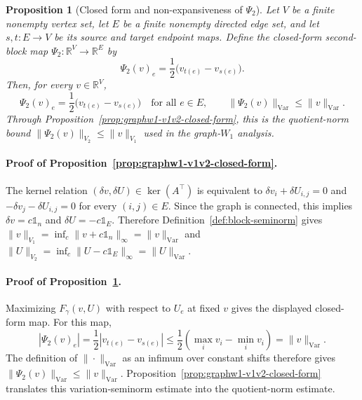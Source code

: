 \documentclass{article}
\theoremstyle{plain}
\newtheorem{proposition}{Proposition}[section]
\newcommand{\ones}{\mathds{1}}
\newcommand{\Edge}{E}
\newcommand{\RR}{\mathbb{R}}
\newcommand{\norm}[1]{\|#1\|}
\newcommand{\normVar}[1]{\norm{#1}_{\mathrm{Var}}}
\begin{document}
\begin{proposition}[Closed form and non-expansiveness of $\Psi_2$]\label{prop:graphw1-psi2-closed-nonexp}
Let $V$ be a finite nonempty vertex set, let $E$ be a finite nonempty directed edge set,
and let $s,t:E\to V$ be its source and target endpoint maps.  Define the closed-form second-block map
$\Psi_2:\RR^V\to\RR^E$ by
\[
  \Psi_2(v)_e=\frac12\bigl(v_{t(e)}-v_{s(e)}\bigr).
\]
Then, for every $v\in\RR^V$,
\begin{equation}\label{eq:Psi2_closed_symmetric}
  \Psi_2(v)_e=\frac12\bigl(v_{t(e)}-v_{s(e)}\bigr)
  \quad\text{for all }e\in E,
  \qquad
  \normVar{\Psi_2(v)}\le \normVar{v}.
\end{equation}
Through Proposition~\ref{prop:graphw1-v1v2-closed-form}, this is the quotient-norm
bound $\|\Psi_2(v)\|_{V_2}\le \|v\|_{V_1}$ used in the graph-$W_1$ analysis.
\end{proposition}

\paragraph{Proof of Proposition~\ref{prop:graphw1-v1v2-closed-form}.}
The kernel relation $(\delta v,\delta U)\in\ker(A^\top)$ is equivalent to $\delta v_i+\delta U_{i,j}=0$ and $-\delta v_j-\delta U_{i,j}=0$ for every $(i,j)\in\Edge$. Since the graph is connected, this implies $\delta v=c\ones_n$ and $\delta U=-c\ones_\Edge$. Therefore Definition~\ref{def:block-seminorm} gives $\|v\|_{V_1}=\inf_c\|v+c\ones_n\|_\infty=\|v\|_{\mathrm{Var}}$ and $\|U\|_{V_2}=\inf_c\|U-c\ones_\Edge\|_\infty=\|U\|_{\mathrm{Var}}$.

\paragraph{Proof of Proposition~\ref{prop:graphw1-psi2-closed-nonexp}.}
Maximizing $F_\gamma(v,U)$ with respect to $U_e$ at fixed $v$ gives the displayed
closed-form map.  For this map,
\[
  |\Psi_2(v)_e|
  =\frac12 |v_{t(e)}-v_{s(e)}|
  \le \frac12(\max_i v_i-\min_i v_i)
  =\normVar{v}.
\]
The definition of $\normVar{\cdot}$ as an infimum over constant shifts therefore gives
$\normVar{\Psi_2(v)}\le\normVar{v}$.  Proposition~\ref{prop:graphw1-v1v2-closed-form}
translates this variation-seminorm estimate into the quotient-norm estimate.
\end{document}
